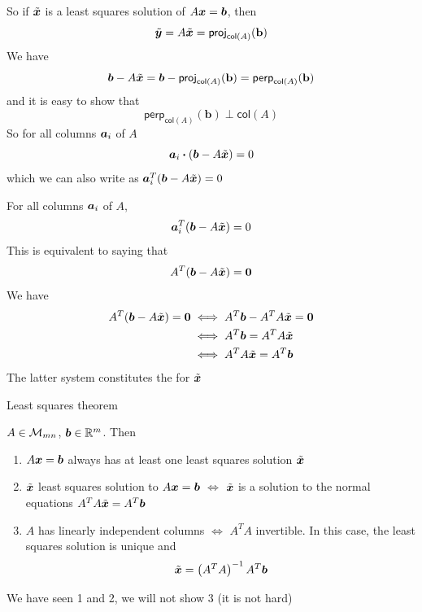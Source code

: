 \documentclass[aspectratio=169]{beamer}\usepackage[]{graphicx}\usepackage[]{xcolor}
\begin{document}
\begin{frame}
So if $\tilde{\bm{x}}$ is a least squares solution of $A\bm{x}=\bm{b}$, then
\[
\tilde{\bm{y}} = A\tilde{\bm{x}} = \mathsf{proj}_{\mathsf{col}(A)}(\mathbf{b})
\]
\vfill
We have
\[
\bm{b}-A\tilde{\bm{x}} = \bm{b}-\mathsf{proj}_{\mathsf{col}(A)}(\mathbf{b}) 
= \mathsf{perp}_{\mathsf{col}(A)}(\mathbf{b})
\]
and it is easy to show that
\[
\mathsf{perp}_{\mathsf{col}(A)}(\mathbf{b}) \perp \mathsf{col}(A)
\]
\vfill
So for all columns $\bm{a}_i$ of $A$
\[
\bm{a}_i\boldsymbol{\cdot}(\bm{b}-A\tilde{\bm{x}}) = 0
\]
which we can also write as $\bm{a}_i^T(\bm{b}-A\tilde{\bm{x}}) = 0$
\end{frame}

\begin{frame}
For all columns $\bm{a}_i$ of $A$,
\[\bm{a}_i^T(\bm{b}-A\tilde{\bm{x}}) = 0
\]
\vfill
This is equivalent to saying that
\[
A^T(\bb-A\tilde\bx) = \b0
\]
\vfill
We have
\begin{align*}
A^T(\bb-A\tilde\bx) = \b0 &\iff A^T\bb - A^TA\tilde\bx = \b0 \\
&\iff A^T\bb = A^TA\tilde\bx \\
&\iff A^TA\tilde\bx = A^T\bb
\end{align*}
The latter system constitutes the  for $\tilde{\bm{x}}$
\end{frame}


\begin{frame}{Least squares theorem}
\begin{importanttheorem}\label{th:least_squares}
$A\in\mathcal{M}_{mn}$, $\bm{b}\in\mathbb{R}^m$. Then
\begin{enumerate}
\item $A\bm{x}=\bm{b}$ always has at least one least squares solution $\tilde{\bm{x}}$
\item $\tilde{\bm{x}}$ least squares solution to $A\bm{x}=\bm{b}$ $\iff$ $\tilde{\bm{x}}$ is a solution to the normal equations $A^TA\tilde{\bm{x}} = A^T\bm{b}$
\item $A$ has linearly independent columns $\iff$ $A^TA$ invertible.  
\newline In this case, the least squares solution is unique and 
\[
\tilde{\bm{x}} = \left(A^TA\right)^{-1}A^T\bm{b}
\]
\end{enumerate}
\end{importanttheorem}
\vfill
We have seen 1 and 2, we will not show 3 (it is not hard)
\end{frame}


\end{document}
